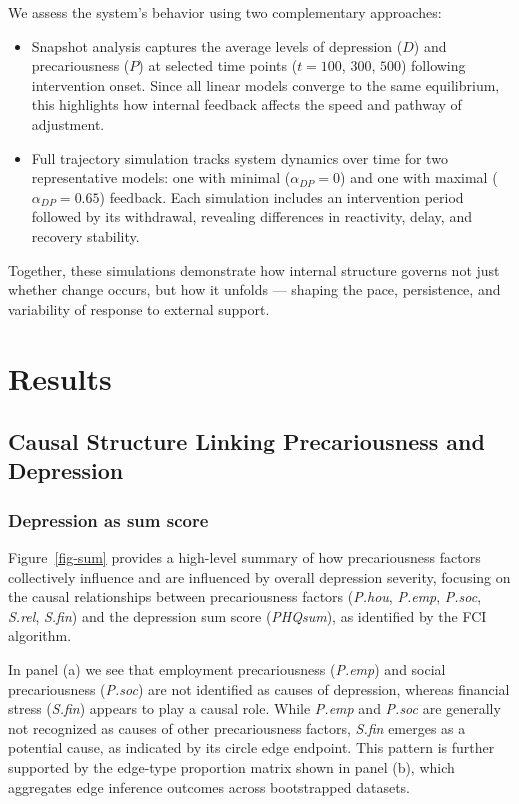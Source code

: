 \documentclass[
]{article}
\begin{document}
We assess the system's behavior using two complementary approaches:

\begin{itemize}
\item
  Snapshot analysis captures the average levels of depression (\(D\))
  and precariousness (\(P\)) at selected time points (\(t = 100\),
  \(300\), \(500\)) following intervention onset. Since all linear
  models converge to the same equilibrium, this highlights how internal
  feedback affects the speed and pathway of adjustment.
\item
  Full trajectory simulation tracks system dynamics over time for two
  representative models: one with minimal (\(\alpha_{DP} = 0\)) and one
  with maximal (\(\alpha_{DP} = 0.65\)) feedback. Each simulation
  includes an intervention period followed by its withdrawal, revealing
  differences in reactivity, delay, and recovery stability.
\end{itemize}

Together, these simulations demonstrate how internal structure governs
not just whether change occurs, but how it unfolds --- shaping the pace,
persistence, and variability of response to external support.

\section{Results}\label{results}

\subsection{Causal Structure Linking Precariousness and
Depression}\label{causal-structure-linking-precariousness-and-depression}

\subsubsection{Depression as sum score}\label{depression-as-sum-score}

Figure~\ref{fig-sum} provides a high-level summary of how precariousness
factors collectively influence and are influenced by overall depression
severity, focusing on the causal relationships between precariousness
factors (\emph{P.hou}, \emph{P.emp}, \emph{P.soc}, \emph{S.rel},
\emph{S.fin}) and the depression sum score (\emph{PHQsum}), as
identified by the FCI algorithm.

In panel (a) we see that employment precariousness (\emph{P.emp}) and
social precariousness (\emph{P.soc}) are not identified as causes of
depression, whereas financial stress (\emph{S.fin}) appears to play a
causal role. While \emph{P.emp} and \emph{P.soc} are generally not
recognized as causes of other precariousness factors, \emph{S.fin}
emerges as a potential cause, as indicated by its circle edge endpoint.
This pattern is further supported by the edge-type proportion matrix
shown in panel (b), which aggregates edge inference outcomes across
bootstrapped datasets.
\end{document}
